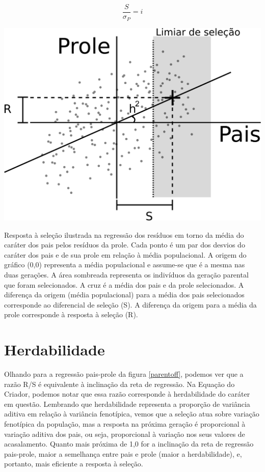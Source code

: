 \documentclass[portuges,]{tufte-handout}
\begin{document}
\[
\frac{S}{\sigma_P} = i
\]

\begin{marginfigure}
\includegraphics{./figuras/parent-offspring.png}
\caption{Resposta à seleção ilustrada na regressão dos resíduos
em torno da média do caráter dos pais pelos resíduos da prole. Cada
ponto é um par dos desvios do caráter dos pais e de sua prole em relação
à média populacional. A origem do gráfico (0,0) representa a média
populacional e assume-se que é a mesma nas duas gerações. A área
sombreada representa os indivíduos da geração parental que foram
selecionados. A cruz é a média dos pais e da prole selecionados. A
diferença da origem (média populacional) para a média dos pais
selecionados corresponde ao diferencial de seleção (S). A diferença da
origem para a média da prole corresponde à resposta à seleção (R).}
\label{parentoff}
\end{marginfigure}

\section{Herdabilidade}\label{herdabilidade}

Olhando para a regressão pais-prole da figura \ref{parentoff}, podemos
ver que a razão R/S é equivalente à inclinação da reta de regressão. Na
Equação do Criador, podemos notar que essa razão corresponde à
herdabilidade do caráter em questão. Lembrando que herdabilidade
representa a proporção de variância aditiva em relação à variância
fenotípica, vemos que a seleção atua sobre variação fenotípica da
população, mas a resposta na próxima geração é proporcional à variação
aditiva dos pais, ou seja, proporcional à variação nos seus valores de
acasalamento. Quanto mais próxima de 1,0 for a inclinação da reta de
regressão pais-prole, maior a semelhança entre pais e prole (maior a
herdabilidade), e, portanto, mais eficiente a resposta à seleção.
\end{document}
